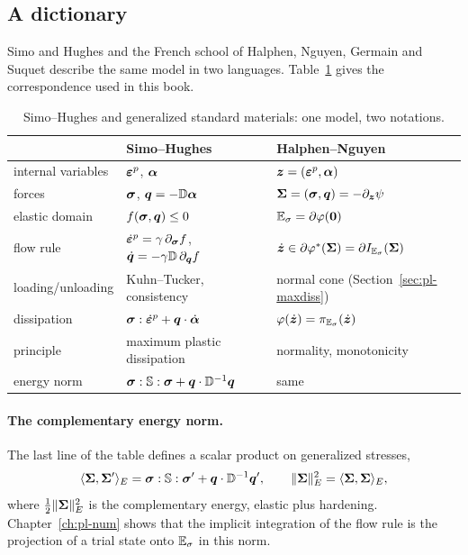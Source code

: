 \subsection{A dictionary}\label{ssec:pl-dictionary}
Simo and Hughes and the French school of Halphen, Nguyen, Germain and Suquet
describe the same model in two languages. Table~\ref{tab:pl-dictionary} gives
the correspondence used in this book.

\begin{table}[h]
\centering\small
\renewcommand{\arraystretch}{1.2}
\begin{tabular}{@{}lll@{}}
\toprule
 & \sffamily Simo--Hughes~\cite{SimoHughes1998} & \sffamily Halphen--Nguyen~\cite{HalphenNguyen1975}\\
\midrule
internal variables & $\bm{\varepsilon}^{p}$, $\bm{\alpha}$ & $\bm{z}=(\bm{\varepsilon}^{p},\bm{\alpha})$\\
forces & $\bm{\sigma}$, $\bm{q}=-\mathbb{D}\bm{\alpha}$ & $\bm{\Sigma}=(\bm{\sigma},\bm{q})=-\partial_{\bm{z}}\psi$\\
elastic domain & $f(\bm{\sigma},\bm{q})\le0$ & $\mathbb{E}_{\sigma}=\partial\varphi(\bm{0})$\\
flow rule & $\dot{\bm{\varepsilon}}^p=\gamma\,\partial_{\bm{\sigma}}f$, $\dot{\bm{q}}=-\gamma\mathbb{D}\,\partial_{\bm{q}}f$ & $\dot{\bm{z}}\in\partial\varphi^\ast(\bm{\Sigma})=\partial I_{\mathbb{E}_{\sigma}}(\bm{\Sigma})$\\
loading/unloading & Kuhn--Tucker, consistency & normal cone (Section~\ref{sec:pl-maxdiss})\\
dissipation & $\bm{\sigma}:\dot{\bm{\varepsilon}}^p+\bm{q}\cdot\dot{\bm{\alpha}}$ & $\varphi(\dot{\bm{z}})=\pi_{\mathbb{E}_{\sigma}}(\dot{\bm{z}})$\\
principle & maximum plastic dissipation & normality, monotonicity\\
energy norm & $\bm{\sigma}:\mathbb{S}:\bm{\sigma}+\bm{q}\cdot\mathbb{D}^{-1}\bm{q}$ & same\\
\bottomrule
\end{tabular}
\caption{Simo--Hughes and generalized standard materials: one model, two
notations.}
\label{tab:pl-dictionary}
\end{table}

\paragraph{The complementary energy norm.}
%
The last line of the table defines a scalar product on generalized stresses,
\begin{equation}\label{eq:pl-energynorm}
  \langle \bm{\Sigma},\bm{\Sigma}'\rangle_{E}=\bm{\sigma}:\mathbb{S}:\bm{\sigma}'+\bm{q}\cdot\mathbb{D}^{-1}\bm{q}',\qquad
  \lVert \bm{\Sigma}\rVert_E^2=\langle \bm{\Sigma},\bm{\Sigma}\rangle_E ,
\end{equation}
where $\tfrac12\lVert \bm{\Sigma}\rVert_E^2$ is the complementary energy, elastic plus
hardening. Chapter~\ref{ch:pl-num} shows that the implicit integration of the
flow rule is the projection of a trial state onto $\mathbb{E}_{\sigma}$ in this norm.

